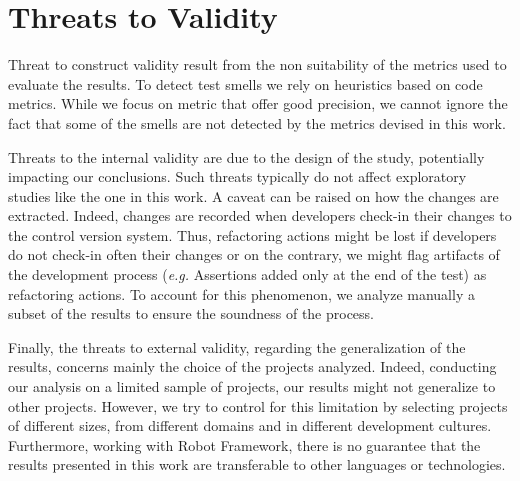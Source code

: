 \section{Threats to Validity}

Threat to construct validity result from the non suitability of the metrics used to evaluate the results. To detect test smells we rely on heuristics based on code metrics. While we focus on metric that offer good precision, we cannot ignore the fact that some of the smells are not detected by the metrics devised in this work.

Threats to the internal validity are due to the design of the study, potentially impacting our conclusions. Such threats typically do not affect exploratory studies like the one in this work. A caveat can be raised on how the changes are extracted. Indeed, changes are recorded when developers check-in their changes to the control version system. Thus, refactoring actions might be lost if developers do not check-in often their changes or on the contrary, we might flag artifacts of the development process (\emph{e.g.} Assertions added only at the end of the test) as refactoring actions. To account for this phenomenon, we analyze manually a subset of the results to ensure the soundness of the process.

Finally, the threats to external validity, regarding the generalization of the results, concerns mainly the choice of the projects analyzed. Indeed, conducting our analysis on a limited sample of projects, our results might not generalize to other projects. However, we try to control for this limitation by selecting projects of different sizes, from different domains and in different development cultures. Furthermore, working with Robot Framework, there is no guarantee that the results presented in this work are transferable to other languages or technologies.
